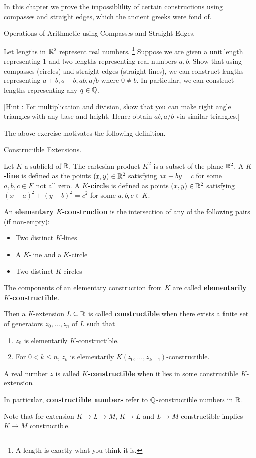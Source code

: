 \documentclass[../book.tex]{subfiles}
\begin{document}
In this chapter we prove the impossiblility of certain constructions
using compasses and straight edges, which the ancient greeks were fond of.

\begin{ex} Operations of Arithmetic using Compasses and Straight Edges.
    
    Let lengths in $\mathbb{R}^2$ represent real numbers.
    \footnote{A length is exactly what you think it is.}
    Suppose we are given a unit length representing 1 and
    two lengths representing real numbers $a, b$.
    Show that using compasses (circles) and straight edges (straight lines),
    we can construct lengths representing $a + b, a - b, a b , a / b$
    where $0 \neq b$. 
    In particular, we can construct lengths representing any $q \in \mathbb{Q}$.
    
    [Hint : For multiplication and division,
    show that you can make right angle triangles with any base and height.
    Hence obtain $ab, a/b$ via similar triangles.]
    
\end{ex}
The above exercise motivates the following definition. 
\begin{dfn} Constructible Extensions.
    
    Let $K$ a subfield of $\mathbb{R}$. 
    The cartesian product $K^2$ is a subset of the plane $\mathbb{R}^2$. 
    A \textbf{$K$-line} is defined as the points $(x,y) \in \mathbb{R}^2$ satisfying
    $a x + by = c$ for some $a, b, c \in K$ not all zero.
    A \textbf{$K$-circle} is defined as points $(x,y) \in \mathbb{R}^2$ satisfying
    $(x - a)^2 + (y - b)^2 = c^2$ for some $a, b, c \in K$.
    
    An \textbf{elementary $K$-construction} is 
    the intersection of any of the following pairs (if non-empty): 
    \begin{itemize}
        \item Two distinct $K$-lines
        \item A $K$-line and a $K$-circle
        \item Two distinct $K$-circles
    \end{itemize}
    The components of an elementary construction from $K$ are called
    \textbf{elementarily $K$-constructible}.
    
    Then a $K$-extension $L \subseteq \mathbb{R}$ is called \textbf{constructible} when
    there exists a finite set of generators $z_0,\dots,z_n$ of $L$ such that 
    \begin{enumerate}
        \item $z_0$ is elementarily $K$-constructible.
        \item For $0 < k \leq n$,
        $z_k$ is elementarily $K(z_0,\dots,z_{k-1})$-constructible.
    \end{enumerate}
    A real number $z$ is called \textbf{$K$-constructible} when
    it lies in some constructible $K$-extension. 
    
    In particular, 
    \textbf{constructible numbers} refer to $\mathbb{Q}$-constructible numbers in $\mathbb{R}$.
    
    Note that for extension $K \to L \to M$,
    $K \to L$ and $L \to M$ constructible implies $K \to M$ constructible. 
\end{dfn}
\end{document}
